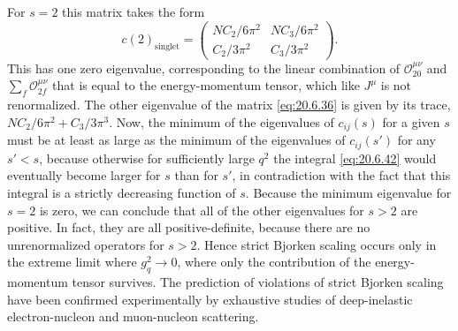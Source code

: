 For $s=2$ this matrix takes the form
\begin{equation}
c(2)_{\mathrm{singlet}}
=
\begin{pmatrix}
NC_2/6\pi^2&NC_3/6\pi^2\\
C_2/3\pi^2&C_3/3\pi^2
\end{pmatrix}.
\tag{20.6.60}\label{eq:20.6.60}
\end{equation}
This has one zero eigenvalue, corresponding to the linear combination of $\mathcal O_{20}^{\mu\nu}$ and $\sum_f\mathcal O_{2f}^{\mu\nu}$ that is equal to the energy-momentum tensor, which like $J^\mu$ is not renormalized. The other eigenvalue of the matrix \eqref{eq:20.6.36} is given by its trace, $NC_2/6\pi^2+C_3/3\pi^3$. Now, the minimum of the eigenvalues of $c_{ij}(s)$ for a given $s$ must be at least as large as the minimum of the eigenvalues of $c_{ij}(s')$ for any $s'<s$, because otherwise for sufficiently large $q^2$ the integral \eqref{eq:20.6.42} would eventually become larger for $s$ than for $s'$, in contradiction with the fact that this integral is a strictly decreasing function of $s$. Because the minimum eigenvalue for $s=2$ is zero, we can conclude that all of the other eigenvalues for $s>2$ are positive. In fact, they are all positive-definite, because there are no unrenormalized operators for $s>2$. Hence strict Bjorken scaling occurs only in the extreme limit where $g_q^2\to0$, where only the contribution of the energy-momentum tensor survives. The prediction of violations of strict Bjorken scaling have been confirmed experimentally by exhaustive studies of deep-inelastic electron-nucleon and muon-nucleon scattering.
